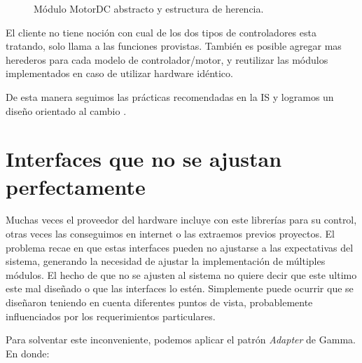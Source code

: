 \begin{figure}
\caption{Módulo MotorDC abstracto y estructura de herencia.}
\label{estructuraHerencia}
\begin{center}
\end{center}
\end{figure}

El cliente no tiene noción con cual de los dos tipos de controladores esta tratando, solo llama a las funciones provistas. También es posible agregar mas herederos para cada modelo de controlador/motor, y reutilizar las módulos implementados en caso de utilizar hardware idéntico. 

De esta manera seguimos las prácticas recomendadas en la IS \cite{ShawGarlan1996, ghezzi2003, bass2003, DBLP:books/daglib/0030743} y logramos un diseño orientado al cambio \cite{Gamma:1995:DPE:186897}.

\section{Interfaces que no se ajustan perfectamente}
Muchas veces el proveedor del hardware incluye con este librerías para su control, otras veces las conseguimos en internet o las extraemos previos proyectos. El problema recae en que estas interfaces pueden no ajustarse a las expectativas del sistema, generando la necesidad de ajustar la implementación de múltiples módulos. El hecho de que no se ajusten al sistema no quiere decir que este ultimo este mal diseñado o que las interfaces lo estén. Simplemente puede ocurrir que se diseñaron teniendo en cuenta diferentes puntos de vista, probablemente influenciados por los requerimientos particulares.

Para solventar este inconveniente, podemos aplicar el patrón \textit{Adapter} de Gamma. En donde:

